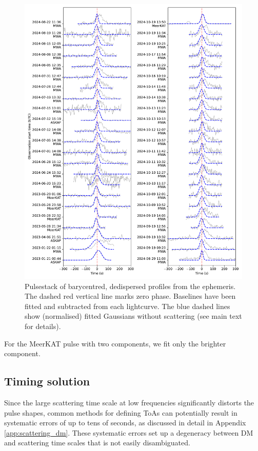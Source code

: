 \documentclass[fleqn,usenatbib]{mnras}
\begin{document}
\begin{figure}
      \centering
          \includegraphics[width=0.95\linewidth]{pulsestack.pdf}
              \caption{Pulsestack of barycentred, dedispersed profiles from the ephemeris. The dashed red vertical line marks zero phase. Baselines have been fitted and subtracted from each lightcurve. The blue dashed lines show (normalised) fitted Gaussians without scattering (see main text for details).}
                  \label{fig:pulsestack}
\end{figure}

For the MeerKAT pulse with two components, we fit only the brighter component.

\subsection{Timing solution} \label{sec:timing}

Since the large scattering time scale at low frequencies significantly distorts the pulse shapes, common methods for defining ToAs can potentially result in systematic errors of up to tens of seconds, as discussed in detail in Appendix \ref{app:scattering_dm}.
These systematic errors set up a degeneracy between DM and scattering time scales that is not easily disambiguated.
\end{document}
